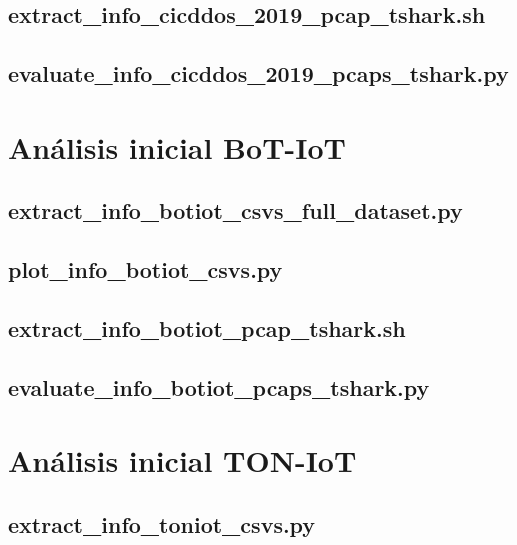 \documentclass[11pt]{report}
\begin{document}
\section{extract\_info\_cicddos\_2019\_pcap\_tshark.sh}


\section{evaluate\_info\_cicddos\_2019\_pcaps\_tshark.py}


\chapter{Análisis inicial BoT-IoT}
\section{extract\_info\_botiot\_csvs\_full\_dataset.py}


\section{plot\_info\_botiot\_csvs.py}


\section{extract\_info\_botiot\_pcap\_tshark.sh}


\section{evaluate\_info\_botiot\_pcaps\_tshark.py}


\chapter{Análisis inicial TON-IoT}
\section{extract\_info\_toniot\_csvs.py}

\end{document}
